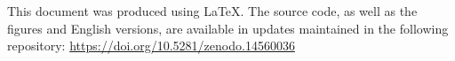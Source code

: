 \documentclass[./main_en.tex]{subfiles}
\begin{document}
\doublespacing %
\large

\newpage
\renewcommand{\headrulewidth}{0pt}
\thispagestyle{fancy}
\fancyhf{} %
\fancyfoot{} %
\fancyfoot[C]{\thepage}

\begin{center}
    \vspace{5mm}
\end{center}
\singlespacing
\normalsize

\setlength{\parskip}{\myparskip}

\par This document was produced using \LaTeX. The source code, as well as the figures and English versions, are available in updates maintained in the following repository: \href{https://doi.org/10.5281/zenodo.14560036}{https://doi.org/10.5281/zenodo.14560036}


\clearpage
\end{document}
